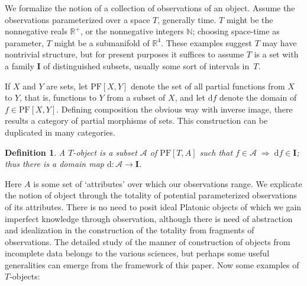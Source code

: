 \documentclass[10pt,a4paper,twocolumn]{article}
\newtheorem*{definition*}{Definition}
\newcommand{\A}{\mathcal{A}}          %
\newcommand{\Iset}{\mathbf{I}}          %
\newcommand{\R}{\mathbb{R}}
\newcommand{\Rpos}{\R^{+}}
\newcommand{\PF}{\mathrm{PF}}
\newcommand{\dom}{\mathrm{d}}            %
\begin{document}
We formalize the notion of a collection of observations of an object.
Assume the observations parameterized over a space $T$, generally time.
$T$ might be the nonnegative reals $\Rpos$, or the nonnegative integers $\mathbb{N}$; choosing space-time as parameter, $T$ might be a submanifold of $\R^{4}$.
These examples suggest $T$ may have nontrivial structure, but for present purposes it suffices to assume $T$ is a set with a family $\Iset$ of distinguished subsets, usually some sort of intervals in~$T$.

If $X$ and $Y$ are sets, let $\PF[X,Y]$ denote the set of all partial functions from $X$ to $Y$, that is, functions to $Y$ from a subset of $X$, and let $\dom f$ denote the domain of $f\in\PF[X,Y]$.
Defining composition the obvious way with inverse image, there results a category of partial
morphisms of sets.
This construction can be duplicated in many categories.

\begin{definition*}
	A \emph{$T$-object} is a subset $\A$ of $\PF[T,A]$ such that $f\in\A \;\Rightarrow\; \dom f\in\Iset$; thus there is a domain map $\dom\colon \A\to\Iset$.
\end{definition*}

Here $A$ is some set of `attributes' over which our observations range.
We explicate the notion of object through the totality of potential parameterized observations of its attributes.
There is no need to posit ideal Platonic objects of which we gain imperfect knowledge through
observation, although there is need of abstraction and idealization in the construction of the totality from fragments of observations.
The detailed study of the manner of construction of objects from incomplete data belongs to the various sciences, but perhaps some useful generalities can emerge from the framework of this paper.
Now some examples of $T$-objects:
\end{document}
